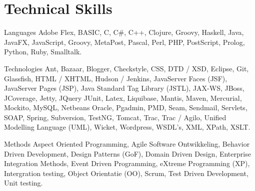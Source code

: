 \section*{Technical Skills}

	\begin{skillList}
		\item[Languages] Adobe Flex, BASIC, C, C\#, C++, Clojure, Groovy, Haskell, 
		Java, JavaFX, JavaScript, Groovy, MetaPost, Pascal, Perl, PHP, PostScript, 
		Prolog, Python, Ruby, Smalltalk.\hfill\\
		
		\item[Technologies] Ant, Bazaar, Blogger, Checkstyle, CSS, DTD / XSD, 
		Eclipse, Git, Glassfish, HTML / XHTML, Hudson / Jenkins, 
		JavaServer Faces (JSF), JavaServer Pages (JSP), 
		Java Standard Tag Library (JSTL), JAX-WS, JBoss, JCoverage, Jetty, JQuery
		JUnit, Latex, Liquibase, Mantis, Maven, Mercurial, Mockito, MySQL, Netbeans
		Oracle, Pgadmin, PMD, Seam, Sendmail, Servlets, SOAP, Spring, Subversion,
		TestNG, Tomcat, Trac, Trac / Agilo, Unified Modelling Language (UML),
		Wicket, Wordpress, WSDL's, XML, XPath, XSLT.\hfill\\
		
		\item[Methods] Aspect Oriented Programming, Agile Software Ontwikkeling,
		Behavior Driven Development, Design Patterns (GoF), Domain Driven Design, 
		Enterprise Integration Methods, Event Driven Programming, 
		eXtreme Programming (XP), Intergration testing, Object Orientatie (OO), 
		Scrum, Test Driven Development, Unit testing.\hfill\\
		
	\end{skillList}
